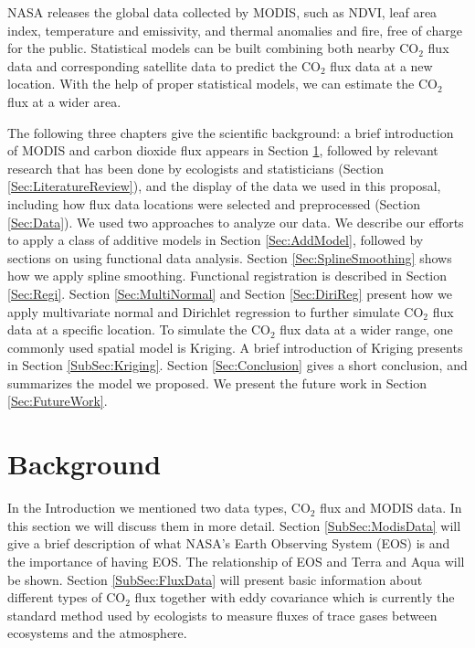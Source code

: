 \documentclass{article}\usepackage[]{graphicx}\usepackage[]{color}
\begin{document}
NASA releases the  global data collected by MODIS,  such as NDVI,  leaf area index, temperature and emissivity, and thermal anomalies and fire, free of charge for the public.  Statistical models can be built combining both nearby CO$_2$ flux data and corresponding satellite data to predict the CO$_2$ flux data at a new location. With the help of proper statistical models, we can estimate the CO$_2$ flux at a wider area.

\smallskip

The following three chapters give the scientific background: 
 a brief introduction of MODIS and carbon dioxide flux appears in Section \ref{Sec:Background}, followed by relevant research that has been done by ecologists and statisticians (Section \ref{Sec:LiteratureReview}), and the display of the data we used in this proposal, including how flux data locations were selected and preprocessed (Section \ref{Sec:Data}).
We used two approaches to analyze our data. 
We describe our efforts to apply a class of additive models in Section \ref{Sec:AddModel}, followed by sections on using functional data analysis. 
Section \ref{Sec:SplineSmoothing} shows how we apply spline smoothing. Functional registration is described in Section \ref{Sec:Regi}. Section \ref{Sec:MultiNormal} and Section \ref{Sec:DiriReg} present  how we apply multivariate normal and Dirichlet regression to further simulate CO$_2$ flux data at a specific location.  
To simulate the CO$_2$ flux data at a wider range, one commonly used spatial model is Kriging. A brief introduction of Kriging presents in Section \ref{SubSec:Kriging}.
Section \ref{Sec:Conclusion} gives a short conclusion, and summarizes the model we proposed. 
We present the future work in Section \ref{Sec:FutureWork}.


\bigskip

\section{Background}\label{Sec:Background}

In the Introduction we mentioned two data types, CO$_2$ flux and MODIS data. In this section we will discuss them in more detail. 
Section \ref{SubSec:ModisData} will give a brief description of what NASA's Earth Observing System (EOS) is and the importance of having EOS. The relationship of EOS and Terra and Aqua will be shown. 
Section \ref{SubSec:FluxData} will present basic information about different types of CO$_2$ flux together with eddy covariance which is currently the standard method used by ecologists to measure fluxes of trace gases between ecosystems and the atmosphere. 
\end{document}
